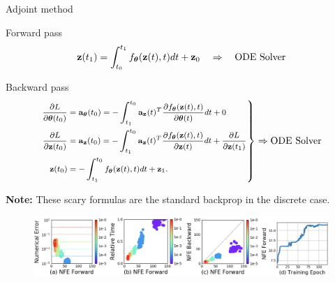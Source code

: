 \begin{frame}{Adjoint method}
	\vspace{-0.2cm}
	\begin{block}{Forward pass}
		\vspace{-0.5cm}
		\[
		\mathbf{z}(t_1) = \int^{t_1}_{t_0} f_{\boldsymbol{\theta}}(\mathbf{z}(t), t) d t  + \mathbf{z}_0 \quad \Rightarrow \quad \text{ODE Solver}
		\]
		\vspace{-0.6cm}
	\end{block}
	\begin{block}{Backward pass}
		\vspace{-0.8cm}
		\begin{equation*}
			\left.
			{\footnotesize 
				\begin{aligned}
					\frac{\partial L}{\partial \boldsymbol{\theta}(t_0)} &= \mathbf{a}_{\boldsymbol{\theta}}(t_0) =  - \int_{t_1}^{t_0} \mathbf{a}_{\mathbf{z}}(t)^T \frac{\partial f_{\boldsymbol{\theta}}(\mathbf{z}(t), t)}{\partial \boldsymbol{\theta}(t)} dt + 0 \\
					\frac{\partial L}{\partial \mathbf{z}(t_0)} &= \mathbf{a}_{\mathbf{z}}(t_0) =  - \int_{t_1}^{t_0} \mathbf{a}_{\mathbf{z}}(t)^T \frac{\partial f_{\boldsymbol{\theta}}(\mathbf{z}(t), t)}{\partial \mathbf{z}(t)} dt + \frac{\partial L}{\partial \mathbf{z}(t_1)} \\
					\mathbf{z}(t_0) &= - \int^{t_0}_{t_1} f_{\boldsymbol{\theta}}(\mathbf{z}(t), t) d t  + \mathbf{z}_1.
				\end{aligned}
			}
			\right\rbrace
			\Rightarrow
			\text{ODE Solver}
		\end{equation*}
		\vspace{-0.4cm} 
	\end{block}
	\textbf{Note:} These scary formulas are the standard backprop in the discrete case.
	\begin{figure}
		\centering
		\includegraphics[width=\linewidth]{figs/neural_ode}
	\end{figure}
\end{frame}
